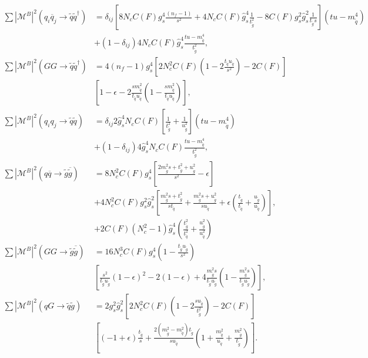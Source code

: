 \begin{align}
\sum|\mathcal{M}^B|^2(q_i\overline{q}_j \to \tilde{q}\tilde{q}^\dagger) &= \delta_{ij}  \left[ 8 N_c C(F) g_s^4\frac{(n_f-1)}{s^2} + 4 N_c C(F) \hat{g}_s^4\frac{1}{t_{\tilde{g}}^2} - 8 C(F)g_s^2\hat{g}_s^2\frac{1}{ t_{\tilde{g}} s} \right] (tu-m_{\tilde{q}}^4)\nonumber\\
 &+ (1-\delta_{ij}) 4 N_c C(F) \hat{g}_s^4\frac{tu-m_{\tilde{q}}^4}{t_{\tilde{g}}^2}, \\
\sum|\mathcal{M}^B|^2(GG \to \tilde{q}\tilde{q}^\dagger) &= 4 (n_f-1) g_s^4 \left[ 2N_c^2C(F) \left(1 - 2\frac{t_{\tilde{q}}u_{\tilde{q}}}{s^2} \right)- 2C(F) \right]\nonumber\\
& \left[ 1 - \epsilon - 2\frac{s m_{\tilde{q}}^2}{t_{\tilde{q}}u_{\tilde{q}}} \left( 1-\frac{s m_{\tilde{q}}^2}{t_{\tilde{q}}u_{\tilde{q}}} \right)\right],\\
\sum|\mathcal{M}^B|^2(q_i q_j \to \tilde{q}\tilde{q}) &= \delta_{ij} 2\hat{g}_s^4 N_c C(F)\left[ \frac{1}{t_{\tilde{g}}^2} + \frac{1}{u_{\tilde{g}}^2} \right] (tu-m_{\tilde{q}}^4)\nonumber\\ 
& + (1-\delta_{ij}) 4 \hat{g}_s^4 N_c C(F) \frac{tu-m_{\tilde{q}}^4}{t_{\tilde{g}}^2},\\
\sum|\mathcal{M}^B|^2(q\overline{q} \to \tilde{g}\overline{\tilde{g}}) &=  8 N_c^2 C(F) g_s^4 \left[ \frac{2m_{\tilde{g}}^2 s + t_{\tilde{g}}^2 + u_{\tilde{g}}^2}{s^2} -\epsilon \right]\nonumber\\
& + 4 N_c^2 C(F) g_s^2 \hat{g}_s^2 \left[ \frac{m_{\tilde{g}}^2 s + t_{\tilde{g}}^2}{s t_{\tilde{q}}} + \frac{m_{\tilde{g}}^2 s + u_{\tilde{g}}^2}{su_{\tilde{q}}} + \epsilon\left( \frac{t_{\tilde{g}}}{t_{\tilde{q}}} + \frac{u_{\tilde{g}}}{u_{\tilde{q}}} \right) \right], \nonumber\\
& + 2C(F)(N_c^2-1) \hat{g}^4_s \left( \frac{t_{\tilde{g}}^2}{t_{\tilde{q}}^2} + \frac{u_{\tilde{g}}^2}{u_{\tilde{q}}^2} \right)\\
\sum|\mathcal{M}^B|^2(GG \to \tilde{g}\overline{\tilde{g}}) &=  16 N_c^3 C(F) g_s^4 \left( 1- \frac{t_{\tilde{g}}u_{\tilde{g}}}{s^2} \right)\nonumber\\
&\left[ \frac{s^2}{t_{\tilde{g}}u_{\tilde{g}}}(1-\epsilon)^2-2(1-\epsilon) + 4\frac{m_{\tilde{g}}^2 s}{t_{\tilde{g}}u_{\tilde{g}}}\left(1-\frac{m_{\tilde{g}}^2 s}{t_{\tilde{g}}u_{\tilde{g}}}  \right) \right],\\
\sum|\mathcal{M}^B|^2(qG \to \tilde{q}\tilde{g}) &=  2g_s^2\hat{g}_s^2 \left[ 2 N_c^2 C(F) \left(1-2\frac{s u_{\tilde{q}}}{t_{\tilde{g}}^2}\right) - 2C(F) \right] \nonumber\\
&\left[ (-1+\epsilon)\frac{t_{\tilde{g}}}{s} + \frac{2(m_{\tilde{g}}^2-m_{\tilde{q}}^2)t_{\tilde{g}}}{s u_{\tilde{q}}}\left( 1+\frac{m_{\tilde{q}}^2}{u_{\tilde{q}}} + \frac{m_{\tilde{g}}^2}{t_{\tilde{g}}} \right) \right].
\end{align}
